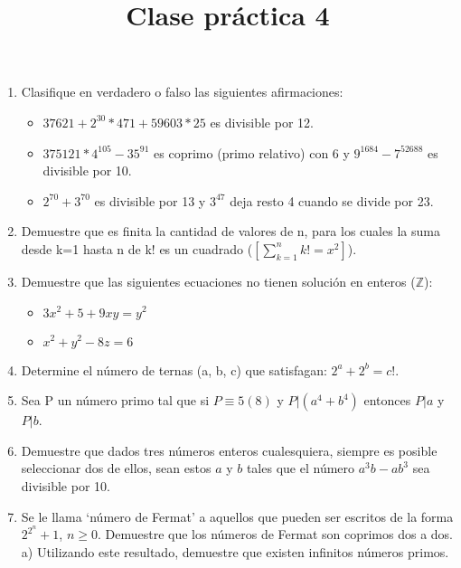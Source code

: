 \documentclass{article}
\title{Clase pr\'actica 4}
\begin{document}
\maketitle
\begin{enumerate}
    \item Clasifique en verdadero o falso las siguientes afirmaciones:
    \begin{itemize} 
        \item $37621 + 2^{30} * 471 + 59603 * 25$ es divisible por 12.
        \item $375121  * 4^{105} - 35^{91}$ es coprimo (primo relativo) con 6 y $9^{1684} - 7^{52688}$ es divisible por 10.
        \item $2^{70} + 3^{70}$ es divisible por 13 y $3^{47}$ deja resto 4 cuando se divide por 23.
    \end{itemize}
    \item Demuestre que es finita la cantidad de valores de n, para los cuales la suma desde k=1 hasta n de k! es un cuadrado ($\left[\sum_{k=1}^{n} k! = x^{2}\right]$).
    \item Demuestre que las siguientes ecuaciones no tienen soluci\'on en enteros ($\mathbb{Z}$):
        \begin{itemize}
            \item $3x^{2} + 5 + 9xy = y^{2}$
            \item $x^{2} + y^{2} - 8z = 6$
        \end{itemize}
    \item Determine el n\'umero de ternas (a, b, c) que satisfagan: $2^{a} + 2^{b} = c!$.
    \item Sea P un n\'umero primo tal que si $P \equiv 5(8)$ y $P| \left( a^{4} + b^{4} \right) $ entonces $P|a$ y $P|b$.
    \item Demuestre que dados tres n\'umeros enteros cualesquiera, siempre es posible seleccionar dos de ellos, sean estos $a$ y $b$ tales que el n\'umero $a^{3}b - ab^{3}$ sea divisible por 10.
    \item Se le llama `n\'umero de Fermat' a aquellos que pueden ser escritos de la forma $2^{2^{n}}+ 1$, $n \geq 0$. Demuestre que los n\'umeros de Fermat son coprimos dos a dos.\\
    a) Utilizando este resultado, demuestre que existen infinitos n\'umeros primos.    
\end{enumerate}
\end{document}
